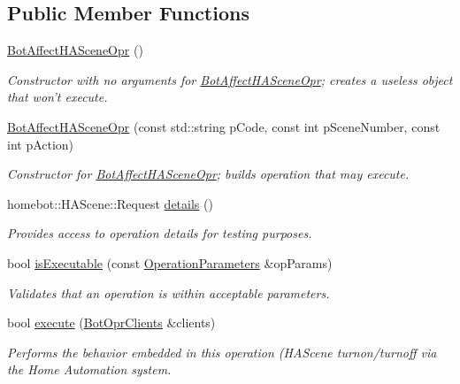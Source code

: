\subsection*{Public Member Functions}
\begin{DoxyCompactItemize}
\item 
\hypertarget{classBotAffectHASceneOpr_a5564fd349eeefe4f1ee96a06de755f4e}{\hyperlink{classBotAffectHASceneOpr_a5564fd349eeefe4f1ee96a06de755f4e}{Bot\-Affect\-H\-A\-Scene\-Opr} ()}\label{classBotAffectHASceneOpr_a5564fd349eeefe4f1ee96a06de755f4e}

\begin{DoxyCompactList}\small\item\em Constructor with no arguments for \hyperlink{classBotAffectHASceneOpr}{Bot\-Affect\-H\-A\-Scene\-Opr}; creates a useless object that won't execute. \end{DoxyCompactList}\item 
\hyperlink{classBotAffectHASceneOpr_a7b924f64c28de823aae0591ac9b0d6ff}{Bot\-Affect\-H\-A\-Scene\-Opr} (const std\-::string p\-Code, const int p\-Scene\-Number, const int p\-Action)
\begin{DoxyCompactList}\small\item\em Constructor for \hyperlink{classBotAffectHASceneOpr}{Bot\-Affect\-H\-A\-Scene\-Opr}; builds operation that may execute. \end{DoxyCompactList}\item 
homebot\-::\-H\-A\-Scene\-::\-Request \hyperlink{classBotAffectHASceneOpr_a78d554b4969e6d1f64cd5b812662153b}{details} ()
\begin{DoxyCompactList}\small\item\em Provides access to operation details for testing purposes. \end{DoxyCompactList}\item 
bool \hyperlink{classBotAffectHASceneOpr_ada2804cb3287adacbfe0c1d5015842c8}{is\-Executable} (const \hyperlink{classOperationParameters}{Operation\-Parameters} \&op\-Params)
\begin{DoxyCompactList}\small\item\em Validates that an operation is within acceptable parameters. \end{DoxyCompactList}\item 
bool \hyperlink{classBotAffectHASceneOpr_a1ea965477504ea6a7e3d7c89ced15b3b}{execute} (\hyperlink{classBotOprClients}{Bot\-Opr\-Clients} \&clients)
\begin{DoxyCompactList}\small\item\em Performs the behavior embedded in this operation (H\-A\-Scene turnon/turnoff via the Home Automation system. \end{DoxyCompactList}\end{DoxyCompactItemize}
